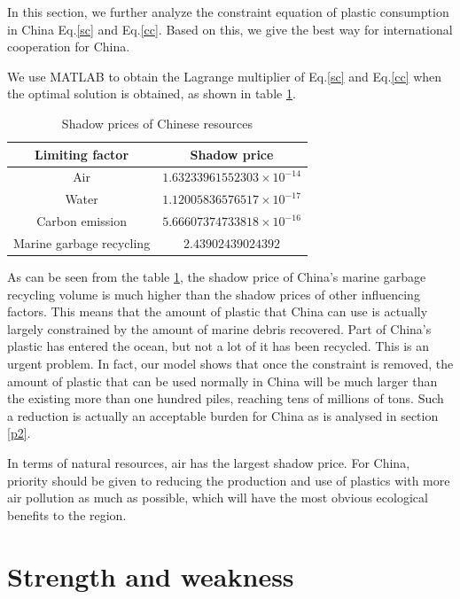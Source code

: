 \documentclass{mcmthesis}
\begin{document}
In this section, we further analyze the constraint equation of plastic consumption in China Eq.\ref{sc} and Eq.\ref{cc}. Based on this, we give the best way for international cooperation for China.

We use MATLAB to obtain the Lagrange multiplier of Eq.\ref{sc} and Eq.\ref{cc} when the optimal solution is obtained, as shown in table \ref{spc}.

\begin{table}[]
	\center
	\caption{Shadow prices of Chinese resources}
	\label{spc}
	\begin{tabular}{|c|c|}
		\hline
		Limiting factor          & Shadow price \\ \hline
		Air                      & $1.63233961552303\times10^{-14}$            \\ \hline
		Water                    & $1.12005836576517\times10^{-17}$            \\ \hline
		Carbon emission          & $5.66607374733818\times10^{-16}$            \\ \hline
		Marine garbage recycling & $2.43902439024392$            \\ \hline
	\end{tabular}
\end{table}

As can be seen from the table \ref{spc}, the shadow price of China's marine garbage recycling volume is much higher than the shadow prices of other influencing factors. This means that the amount of plastic that China can use is actually largely constrained by the amount of marine debris recovered. Part of China's plastic has entered the ocean, but not a lot of it has been recycled. This is an urgent problem. In fact, our model shows that once the constraint is removed, the amount of plastic that can be used normally in China will be much larger than the existing more than one hundred piles, reaching tens of millions of tons. Such a reduction is actually an acceptable burden for China as is analysed in section \ref{p2}.

In terms of natural resources, air has the largest shadow price. For China, priority should be given to reducing the production and use of plastics with more air pollution as much as possible, which will have the most obvious ecological benefits to the region.

\section{Strength and weakness}
\end{document}
